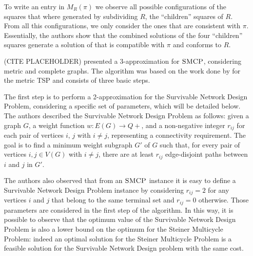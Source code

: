 
To write an entry in \(M_R(\pi)\) we observe all possible configurations of the squares that where generated by subdividing \(R\), the ``children'' squares of \(R\). From all this configurations, we only consider the ones that are consistent with \(\pi\). Essentially, the authors show that the combined solutions of the four ``children'' squares generate a solution of that is compatible with \(\pi\) and conforms to \(R\).


(CITE PLACEHOLDER) presented a 3-approximation for \(\textsc{SMCP}\), considering metric and complete graphs. The algorithm was based on the work done by \cite{Christofides2022WorstCaseAO} for the metric TSP and consists of three basic steps.

The first step is to perform a 2-approximation for the Survivable Network Design Problem, considering a specific set of parameters, which will be detailed below. The authors described the Survivable Network Design Problem as follows: given a graph \(G\), a weight function \(w: E(G) \rightarrow Q+\), and a non-negative integer \(r_{ij}\) for each pair of vertices \(i\), \(j\) with \(i \neq j\), representing a connectivity requirement. The goal is to find a minimum weight subgraph \(G'\) of \(G\) such that, for every pair of vertices \(i, j \in V(G)\) with \(i \neq j\), there are at least \(r_{ij}\) edge-disjoint paths between \(i\) and \(j\) in \(G'\).

The authors also observed that from an \(\textsc{SMCP}\) instance it is easy to define a Survivable Network Design Problem instance by considering \(r_{ij} = 2\) for any vertices \(i\) and \(j\) that belong to the same terminal set and \(r_{ij} = 0\) otherwise. Those parameters are considered in the first step of the algorithm. In this way, it is possible to observe that the optimum value of the Survivable Network Design Problem is also a lower bound on the optimum for the Steiner Multicycle Problem: indeed an optimal solution for the Steiner Multicycle Problem is a feasible solution for the Survivable Network Design problem with the same cost.

